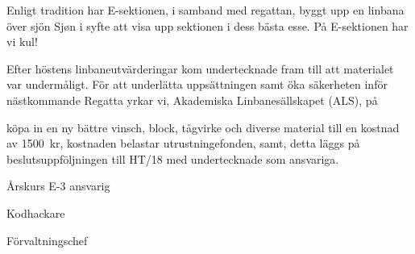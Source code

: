 \documentclass[../_main/handlingar.tex]{subfiles}
\begin{document}

Enligt tradition har E-sektionen, i samband med regattan, byggt upp en linbana över sjön Sjøn i syfte att visa upp sektionen i dess bästa esse.
På E-sektionen har vi kul!

Efter höstens linbaneutvärderingar kom undertecknade fram till att materialet var undermåligt.
För att underlätta uppsättningen samt öka säkerheten inför nästkommande Regatta yrkar vi, Akademiska Linbanesällskapet (ALS), på

\begin{attsatser}
    \att köpa in en ny bättre vinsch, block, tågvirke och diverse material till en kostnad av \SI{1500}{kr},
     \att kostnaden belastar utrustningefonden, samt,
     \att detta läggs på beslutsuppföljningen till HT/18 med undertecknade som ansvariga.
\end{attsatser}

\begin{signatures}{3}
    \mvh
    \signature{Jonatan Kronander}{Årskurs E-3 ansvarig}
    \signature{Filip Kronström}{Kodhackare}
    \signature{Magnus Lundh}{Förvaltningschef}
\end{signatures}
\end{document}
